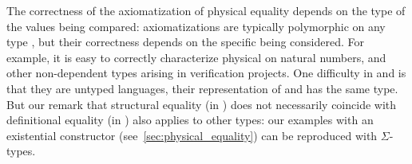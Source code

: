 The correctness of the axiomatization of physical equality depends on the type of the values being compared: axiomatizations are typically polymorphic on any type , but their correctness depends on the specific  being considered.
%
For example, it is easy to correctly characterize physical on natural numbers, and other non-dependent types arising in \Rocq verification projects.
%
One difficulty in \HeapLang and \ZooLang is that they are untyped languages, their representation of  and  has the same type.
%
But our remark that structural equality (in \OCaml) does not necessarily coincide with definitional equality (in \Rocq) also applies to other \Rocq types: our examples with an existential  constructor (see~\cref{sec:physical_equality}) can be reproduced with $\Sigma$-types.
